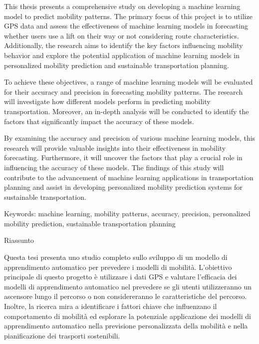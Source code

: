 %
\label{sec:abstract}

This thesis presents a comprehensive study on developing a machine learning model to predict mobility patterns. The primary focus of this project is to utilize GPS data and assess the effectiveness of machine learning models in forecasting whether users use a lift on their way or not considering route characteristics. Additionally, the research aims to identify the key factors influencing mobility behavior and explore the potential application of machine learning models in personalized mobility prediction and sustainable transportation planning.

To achieve these objectives, a range of machine learning models will be evaluated for their accuracy and precision in forecasting mobility patterns. The research will investigate how different models perform in predicting mobility transportation. Moreover, an in-depth analysis will be conducted to identify the factors that significantly impact the accuracy of these models.

By examining the accuracy and precision of various machine learning models, this research will provide valuable insights into their effectiveness in mobility forecasting. Furthermore, it will uncover the factors that play a crucial role in influencing the accuracy of these models. The findings of this study will contribute to the advancement of machine learning applications in transportation planning and assist in developing personalized mobility prediction systems for sustainable transportation.

Keywords: machine learning, mobility patterns, accuracy, precision, personalized mobility prediction, sustainable transportation planning

\newpage

{Riassunto}
\label{sec:abstract-it}

Questa tesi presenta uno studio completo sullo sviluppo di un modello di apprendimento automatico per prevedere i modelli di mobilità. L'obiettivo principale di questo progetto è utilizzare i dati GPS e valutare l'efficacia dei modelli di apprendimento automatico nel prevedere se gli utenti utilizzeranno un ascensore lungo il percorso o non considereranno le caratteristiche del percorso. Inoltre, la ricerca mira a identificare i fattori chiave che influenzano il comportamento di mobilità ed esplorare la potenziale applicazione dei modelli di apprendimento automatico nella previsione personalizzata della mobilità e nella pianificazione dei trasporti sostenibili.

